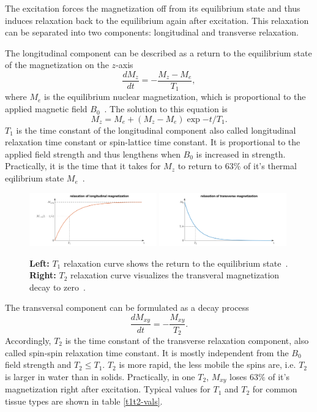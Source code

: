 The excitation forces the magnetization off from its equilibrium state and thus induces relaxation back to the equilibrium again after excitation.
This relaxation can be separated into two components: longitudinal and transverse relaxation.

The longitudinal component can be described as a return to the equilibrium state of the magnetization on the $z$-axis
\[ \frac{d M_z}{d t} = - \frac{M_z - M_e}{T_1}, \]
where $M_e$ is the equilibrium nuclear magnetization, which is proportional to the applied magnetic field $B_0$~\autocite{nishimura}.
The solution to this equation is
\[  M_z = M_e + (M_z - M_e) \exp{-t / T_1}. \]
$T_1$ is the time constant of the longitudinal component also called longitudinal relaxation time constant or spin-lattice time constant.
It is proportional to the applied field strength and thus lengthens when $B_0$ is increased in strength.
Practically, it is the time that it takes for $M_z$ to return to $63 \%$ of it's thermal eqilibrium state $M_e$~\autocite{relaxation, lauterbur}.
   \begin{figure}[h]
      \begin{center}
         \includegraphics[keepaspectratio, width=0.49\textwidth]{img/t1.png}
         \includegraphics[keepaspectratio, width=0.49\textwidth]{img/t2.png}
      \end{center}
      \caption{
         \textbf{Left:} $T_1$ relaxation curve shows the return to the equilibrium state~\autocite{RelaxationlongitudinalmagnetizationSpinlatticerelaxationWikipedia-2024-05-01}.
         \textbf{Right:} $T_2$ relaxation curve visualizes the transveral magnetization decay to zero~\autocite{RelaxationtransversemagnetizationSpinspinrelaxationWikipedia-2024-05-01}.
      }
      \label{relaxations}
   \end{figure}

The transversal component can be formulated as a decay process
\[ \frac{d M_{xy}}{d t} = - \frac{M_{xy}}{T_2}. \]
Accordingly, $T_2$ is the time constant of the transverse relaxation component, also called spin-spin relaxation time constant.
It is mostly independent from the $B_0$ field strength and $T_2 \leq T_1$.
$T_2$ is more rapid, the less mobile the spins are, i.e. $T_2$ is larger in water than in solids.
Practically, in one $T_2$, $M_{xy}$ loses $63 \%$ of it's magnetization right after excitation.
Typical values for $T_1$ and $T_2$ for common tissue types are shown in table \ref{t1t2-vals}.

